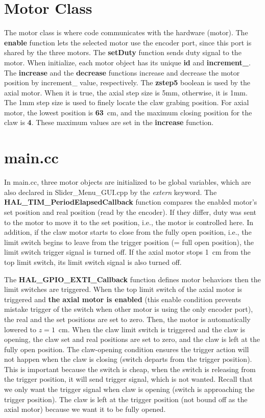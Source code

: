 \documentclass[review,number,sort&compress]{elsarticle}
\begin{document}
\section{Motor Class}
The motor class is where code communicates with the hardware (motor). 
The \textbf{enable} function lets the selected motor use the encoder port, 
since this port is shared by the three motors.
The \textbf{setDuty} function sends duty signal to the motor.
When initialize, each motor object has its unique \textbf{id} and \textbf{increment\_}. 
The \textbf{increase} and the \textbf{decrease} functions increase and decrease the motor position by increment\_ value, respectively.
The \textbf{zstep5} boolean is used by the axial motor. When it is true, the axial step size is 5mm, otherwise, it is 1mm. The 1mm step size is used to finely locate
the claw grabing position.
For axial motor, the lowest position is \textbf{63}~cm, and the maximum closing position for the claw is \textbf{4}. These maximum values are set in the \textbf{increase} function.

\section{main.cc}
In main.cc, three motor objects are initialized to be global variables, which are also declared in Slider\_Menu\_GUI.cpp by the \emph{extern} keyword.
The \textbf{HAL\_TIM\_PeriodElapsedCallback} function compares the enabled motor's set position and real position (read by the encoder). 
If they differ, duty was sent to the motor to move it to the set position, i.e., the motor is controlled here.
In addition, if the claw motor starts to  close from the fully open position, i.e., the limit switch begins to leave from the trigger position (= full open position), the limit switch trigger signal is turned off.
If the axial motor stops 1~cm from the top limit switch, its limit switch signal is also turned off.

The \textbf{HAL\_GPIO\_EXTI\_Callback} function defines motor behaviors then the limit switches are triggered.
When the top limit switch of the axial motor is triggered and \textbf{the axial motor is enabled} (this enable condition prevents mistake trigger of the switch when other motor is using the only encoder port), the real and the set positions are set to zero.
Then, the motor is automatically lowered to $z = 1$~cm.
When the claw limit switch is triggered and the claw is opening, the claw set and real positions are set to zero, and the claw is left at the fully open position.
The claw-opening condition ensures the trigger action will not happen when the claw is closing (switch departs from the trigger position).
This is important because the switch is cheap, when the switch is releasing from the trigger position, it will send trigger signal, which is not wanted.
Recall that we only want the trigger signal when claw is opening (switch is approaching the trigger position).
The claw is left at the trigger position (not bound off as the axial motor) because we want it to be fully opened.
\end{document}
